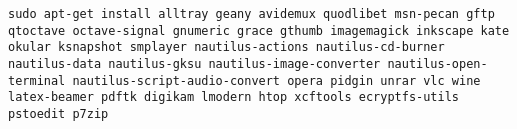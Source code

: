 \documentclass[a4paper,twoside]{article}
\begin{document}
\begin{enumerate}

\texttt{sudo apt-get install alltray geany avidemux quodlibet msn-pecan gftp qtoctave octave-signal gnumeric grace gthumb imagemagick inkscape kate okular ksnapshot smplayer nautilus-actions nautilus-cd-burner nautilus-data nautilus-gksu nautilus-image-converter nautilus-open-terminal nautilus-script-audio-convert opera pidgin unrar vlc wine latex-beamer pdftk digikam lmodern htop xcftools ecryptfs-utils pstoedit p7zip}


\end{enumerate}
\end{document}
